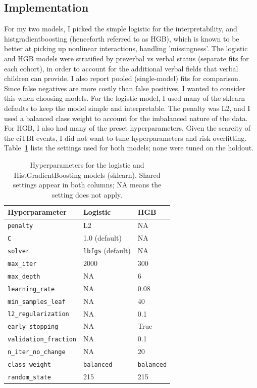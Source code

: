 \documentclass[10pt,letterpaper]{article}
\begin{document}
\subsection{Implementation}
For my two models, I picked the simple logistic for the interpretability, and histgradientboosting (henceforth referred to as HGB), which is known to be better at picking up nonlinear interactions, handling 'missingness'. 
The logistic and HGB models were stratified by preverbal vs verbal status (separate fits for each cohort), in order to account for the additional verbal fields that verbal children can provide. I also report pooled (single-model) fits for comparison.
Since false negatives are more costly than false positives, I wanted to consider this when choosing models.
For the logistic model, I used many of the sklearn defaults to keep the model simple and interpretable. The penalty was L2, and I used a balanced class weight to account for the imbalanced nature of the data.
For HGB, I also had many of the preset hyperparameters. Given the scarcity of the ciTBI events, I did not want to tune hyperparameters and risk overfitting.
Table~\ref{tab:hyperparameters} lists the settings used for both models; none were tuned on the holdout.


\begin{table}[H]
    \centering
    \caption{Hyperparameters for the logistic and HistGradientBoosting models (sklearn). Shared settings appear in both columns; NA means the setting does not apply.}
    \label{tab:hyperparameters}
    \begin{tabular}{lll}
    \hline
    Hyperparameter & Logistic & HGB \\
    \hline
    \texttt{penalty} & L2 & NA \\
    \texttt{C} & 1.0 (default) & NA \\
    \texttt{solver} & \texttt{lbfgs} (default) & NA \\
    \texttt{max\_iter} & 2000 & 300 \\
    \texttt{max\_depth} & NA & 6 \\
    \texttt{learning\_rate} & NA & 0.08 \\
    \texttt{min\_samples\_leaf} & NA & 40 \\
    \texttt{l2\_regularization} & NA & 0.1 \\
    \texttt{early\_stopping} & NA & True \\
    \texttt{validation\_fraction} & NA & 0.1 \\
    \texttt{n\_iter\_no\_change} & NA & 20 \\
    \texttt{class\_weight} & \texttt{balanced} & \texttt{balanced} \\
    \texttt{random\_state} & 215 & 215 \\
    \hline
    \end{tabular}
\end{table}
\end{document}
